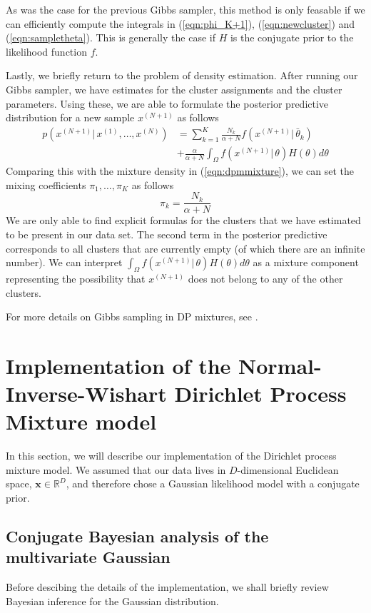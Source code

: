 \documentclass[final,3p,times,twocolumn]{elsarticle}
\let\bs\boldsymbol
\begin{document}
As was the case for the previous Gibbs sampler, this method is only feasable if we can efficiently compute the integrals in (\ref{eqn:phi_K+1}), (\ref{eqn:newcluster}) and (\ref{eqn:sampletheta}).
This is generally the case if $H$ is the conjugate prior to the likelihood function $f$.

Lastly, we briefly return to the problem of density estimation.
After running our Gibbs sampler, we have estimates for the cluster assignments and the cluster parameters.
Using these, we are able to formulate the posterior predictive distribution for a new sample $x^{(N+1)}$ as follows
\begin{equation}
\label{eqn:dompostpred}
\begin{split}
p(x^{(N+1)}|\,x^{(1)},\dots,x^{(N)}) &= \sum_{k=1}^K \frac{N_k}{\alpha+N}f(x^{(N+1)}|\,\bar\theta_k)\\
&+ \frac{\alpha}{\alpha+N}\int_\Omega f(x^{(N+1)}|\,\theta)H(\theta)d\theta
\end{split}
\end{equation}
Comparing this with the mixture density in (\ref{eqn:dpmmixture}), we can set the mixing coefficients $\pi_1,\dots,\pi_K$ as follows
\begin{equation}
\pi_k = \frac{N_k}{\alpha+N}
\end{equation}
We are only able to find explicit formulas for the clusters that we have estimated to be present in our data set.
The second term in the posterior predictive corresponds to all clusters that are currently empty (of which there are an infinite number).
We can interpret $\int_\Omega f(x^{(N+1)}|\,\theta)H(\theta)d\theta$ as a mixture component representing the possibility that $x^{(N+1)}$ does not belong to any of the other clusters. 

For more details on Gibbs sampling in DP mixtures, see \cite{neal2000,orbanz2014}.


\section{Implementation of the Normal-Inverse-Wishart Dirichlet Process Mixture model}
\label{sect:implementation}
In this section, we will describe our implementation of the Dirichlet process mixture model.
We assumed that our data lives in $D$-dimensional Euclidean space, $\bs x \in \mathbb{R}^D$, and therefore chose a Gaussian likelihood model with a conjugate prior.

\subsection{Conjugate Bayesian analysis of the multivariate Gaussian}
Before descibing the details of the implementation, we shall briefly review Bayesian inference for the Gaussian distribution.
\end{document}
